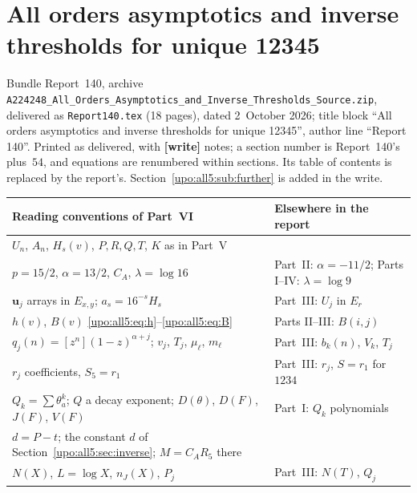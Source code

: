 \documentclass[11pt,letterpaper]{article}
\theoremstyle{remark}\newtheorem{remark}[theorem]{Remark}
\numberwithin{equation}{section}
\newcommand{\bfU}{\boldsymbol u}
\newcommand{\file}[1]{\nolinkurl{#1}}
\newcommand{\partsource}[1]{\par\noindent\begin{minipage}{\textwidth}\small #1\end{minipage}\par\medskip}
\begin{document}
\clearpage
\part{All orders asymptotics and inverse thresholds for unique 12345}\label{upo:all5:part}
\partsource{Bundle Report~140, archive \file{A224248_All_Orders_Asymptotics_and_Inverse_Thresholds_Source.zip}, delivered as \file{Report140.tex} (18 pages), dated 2~October 2026; title block ``All orders asymptotics and inverse thresholds for unique 12345'', author line ``Report 140''. Printed as delivered, with \textbf{[write]} notes; a section number is Report~140's plus~$54$, and equations are renumbered within sections. Its table of contents is replaced by the report's. Section~\ref{upo:all5:sub:further} is added in the write.}
\begin{center}
\small
\begin{tabular}{@{}>{\raggedright\arraybackslash}p{} >{\raggedright\arraybackslash}p{}@{}}
\toprule
Reading conventions of Part~VI & Elsewhere in the report\\
\midrule
$U_n$, $A_n$, $H_s(v)$, $P,R,Q,T$, $K$ as in Part~V & \\
$p=15/2$, $\alpha=13/2$, $C_A$, $\lambda=\log16$ & Part~II: $\alpha=-11/2$; Parts I--IV: $\lambda=\log9$\\
$\bfU_j$ arrays in $E_{x,y}$; $a_s=16^{-s}H_s$ & Part~III: $U_j$ in $E_r$\\
$h(v)$, $B(v)$ \eqref{upo:all5:eq:h}--\eqref{upo:all5:eq:B} & Parts II--III: $B(i,j)$\\
$q_j(n)=[z^n](1-z)^{\alpha+j}$; $v_j$, $T_j$, $\mu_\ell$, $m_\ell$ & Part~III: $b_k(n)$, $V_k$, $T_j$\\
$r_j$ coefficients, $S_5=r_1$ & Part~III: $r_j$, $S=r_1$ for $1234$\\
$Q_k=\sum\theta_a^k$; $Q$ a decay exponent; $D(\theta)$, $D(F)$, $J(F)$, $V(F)$ & Part~I: $Q_k$ polynomials\\
$d=P-t$; the constant $d$ of Section~\ref{upo:all5:sec:inverse}; $M=C_AR_5$ there & \\
$N(X)$, $L=\log X$, $n_J(X)$, $P_j$ & Part~III: $N(T)$, $Q_j$\\
\bottomrule
\end{tabular}
\end{center}
\end{document}
